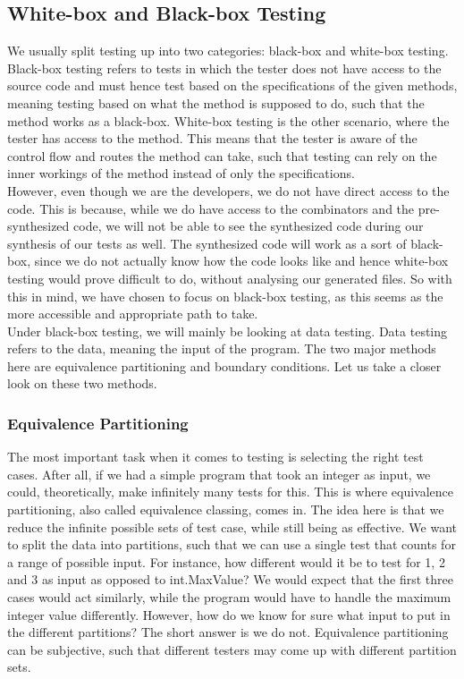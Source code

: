 \subsection{White-box and Black-box Testing}
We usually split testing up into two categories: black-box and white-box testing. Black-box testing refers to tests in which the tester does not have access to the source code and must hence test based on the specifications of the given methods, meaning testing based on what the method is supposed to do, such that the method works as a black-box. White-box testing is the other scenario, where the tester has access to the method. This means that the tester is aware of the control flow and routes the method can take, such that testing can rely on the inner workings of the method instead of only the specifications\cite{TestingCodeComplete}. \\
However, even though we are the developers, we do not have direct access to the code. This is because, while we do have access to the combinators and the pre-synthesized code, we will not be able to see the synthesized code during our synthesis of our tests as well. The synthesized code will work as a sort of black-box, since we do not actually know how the code looks like and hence white-box testing would prove difficult to do, without analysing our generated files. So with this in mind, we have chosen to focus on black-box testing, as this seems as the more accessible and appropriate path to take. \\
Under black-box testing, we will mainly be looking at data testing. Data testing refers to the data, meaning the input of the program\cite{TestingBlackbox}. The two major methods here are equivalence partitioning and boundary conditions. Let us take a closer look on these two methods. 
\subsubsection{Equivalence Partitioning}
The most important task when it comes to testing is selecting the right test cases\cite{TestingBlackbox}. After all, if we had a simple program that took an integer as input, we could, theoretically, make infinitely many tests for this. This is where equivalence partitioning, also called equivalence classing, comes in. The idea here is that we reduce the infinite possible sets of test case, while still being as effective. We want to split the data into partitions, such that we can use a single test that counts for a range of possible input. For instance, how different would it be to test for 1, 2 and 3 as input as opposed to int.MaxValue? We would expect that the first three cases would act similarly, while the program would have to handle the maximum integer value differently. However, how do we know for sure what input to put in the different partitions? The short answer is we do not. Equivalence partitioning can be subjective, such that different testers may come up with different partition sets\cite{TestingBlackbox}.
